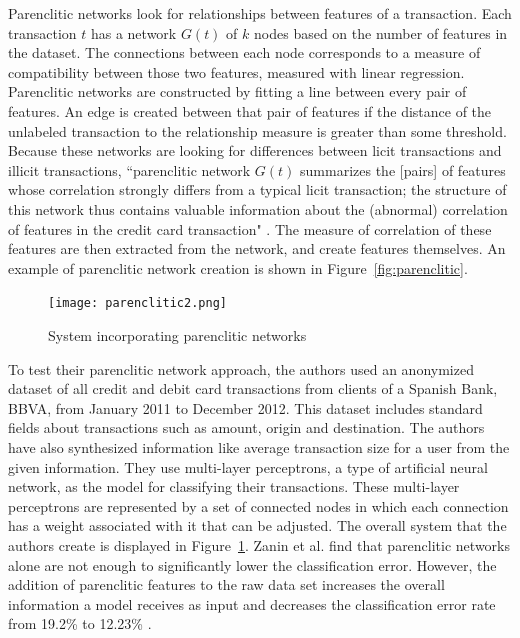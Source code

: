 \documentclass[midd]{thesis}
\begin{document}
Parenclitic networks look for relationships between features of a transaction. Each transaction $t$ has a network $G(t)$ of $k$ nodes based on the number of features in the dataset. The connections between each node corresponds to a measure of compatibility between those two features, measured with linear regression. Parenclitic networks are constructed by fitting a line between every pair of features. An edge is created between that pair of features if the distance of the unlabeled transaction to the relationship measure is greater than some threshold. Because these networks are looking for differences between licit transactions and illicit transactions, ``parenclitic network $G(t)$ summarizes the [pairs] of features whose correlation strongly differs from a typical licit transaction; the structure of this network thus contains valuable information about the (abnormal) correlation of features in the credit card transaction" \cite{Zanin2018}. The measure of correlation of these features are then extracted from the network, and create features themselves. An example of parenclitic network creation is shown in Figure~\ref{fig:parenclitic}. 


\begin{figure}
\centering
  \texttt{[image: parenclitic2.png]}
  \caption{System incorporating parenclitic networks \cite{Zanin2018}}
  \label{fig:parenclitic2}
\end{figure}

To test their parenclitic network approach, the authors used an anonymized dataset of all credit and debit card transactions from clients of a Spanish Bank, BBVA, from January 2011 to December 2012. This dataset includes standard fields about transactions such as amount, origin and destination. The authors have also synthesized information like average transaction size for a user from the given information. They use multi-layer perceptrons, a type of artificial neural network, as the model for classifying their transactions. These multi-layer perceptrons are represented by a set of connected nodes in which each connection has a weight associated with it that can be adjusted. The overall system that the authors create is displayed in Figure~\ref{fig:parenclitic2}. Zanin et al. find that parenclitic networks alone are not enough to significantly lower the classification error. However, the addition of parenclitic features to the raw data set increases the overall information a model receives as input and decreases the classification error rate from 19.2\% to 12.23\% \cite{Zanin2018}. 
\end{document}

